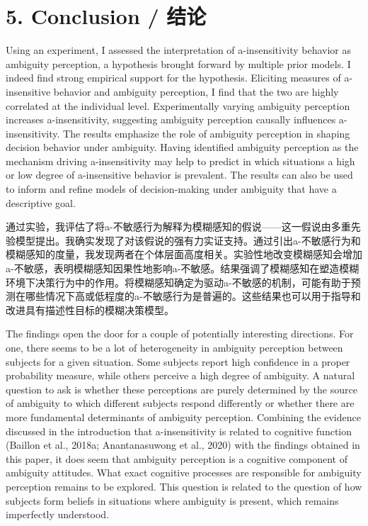 \documentclass[12pt,a4paper]{article}
\newenvironment{original}
  {\par\medskip\noindent\color{black}\ignorespaces}
  {\par\medskip}
\newenvironment{translation}
  {\par\noindent\color{transblue}\ignorespaces}
  {\par\medskip\medskip}
\begin{document}
\newpage
\section{5. Conclusion / 结论}

\begin{original}
Using an experiment, I assessed the interpretation of a-insensitivity behavior as ambiguity perception, a hypothesis brought forward by multiple prior models. I indeed find strong empirical support for the hypothesis. Eliciting measures of a-insensitive behavior and ambiguity perception, I find that the two are highly correlated at the individual level. Experimentally varying ambiguity perception increases a-insensitivity, suggesting ambiguity perception causally influences a-insensitivity. The results emphasize the role of ambiguity perception in shaping decision behavior under ambiguity. Having identified ambiguity perception as the mechanism driving a-insensitivity may help to predict in which situations a high or low degree of a-insensitive behavior is prevalent. The results can also be used to inform and refine models of decision-making under ambiguity that have a descriptive goal.
\end{original}

\begin{translation}
通过实验，我评估了将a-不敏感行为解释为模糊感知的假说——这一假说由多重先验模型提出。我确实发现了对该假说的强有力实证支持。通过引出a-不敏感行为和模糊感知的度量，我发现两者在个体层面高度相关。实验性地改变模糊感知会增加a-不敏感，表明模糊感知因果性地影响a-不敏感。结果强调了模糊感知在塑造模糊环境下决策行为中的作用。将模糊感知确定为驱动a-不敏感的机制，可能有助于预测在哪些情况下高或低程度的a-不敏感行为是普遍的。这些结果也可以用于指导和改进具有描述性目标的模糊决策模型。
\end{translation}

\begin{original}
The findings open the door for a couple of potentially interesting directions. For one, there seems to be a lot of heterogeneity in ambiguity perception between subjects for a given situation. Some subjects report high confidence in a proper probability measure, while others perceive a high degree of ambiguity. A natural question to ask is whether these perceptions are purely determined by the source of ambiguity to which different subjects respond differently or whether there are more fundamental determinants of ambiguity perception. Combining the evidence discussed in the introduction that a-insensitivity is related to cognitive function (Baillon et al., 2018a; Anantanasuwong et al., 2020) with the findings obtained in this paper, it does seem that ambiguity perception is a cognitive component of ambiguity attitudes. What exact cognitive processes are responsible for ambiguity perception remains to be explored. This question is related to the question of how subjects form beliefs in situations where ambiguity is present, which remains imperfectly understood.
\end{original}
\end{document}
